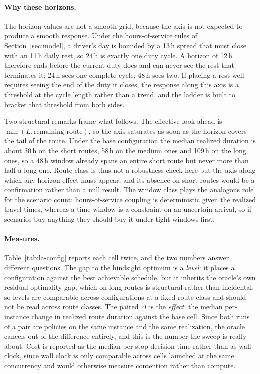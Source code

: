 \paragraph{Why these horizons.}
The horizon values are not a smooth grid, because the axis is not expected to
produce a smooth response.  Under the hours-of-service rules of
Section~\ref{sec:model}, a driver's day is bounded by a 13\,h spread that must
close with an 11\,h daily rest, so 24\,h is exactly one duty cycle.  A horizon
of 12\,h therefore ends before the current duty does and can never see the rest
that terminates it; 24\,h sees one complete cycle; 48\,h sees two.  If placing
a rest well requires seeing the end of the duty it closes, the response along
this axis is a threshold at the cycle length rather than a trend, and the
ladder is built to bracket that threshold from both sides.

Two structural remarks frame what follows.  The effective look-ahead is
$\min(L, \text{remaining route})$, so the axis saturates as soon as the horizon
covers the tail of the route.  Under the base configuration the median realized
duration is about 30\,h on the short routes, 58\,h on the medium ones and
109\,h on the long ones, so a 48\,h window already spans an entire short route
but never more than half a long one.  Route class is thus not a robustness
check here but the axis along which any horizon effect must appear, and its
absence on short routes would be a confirmation rather than a null result.  The
window class plays the analogous role for the scenario count: hours-of-service
coupling is deterministic given the realized travel times, whereas a time
window is a constraint on an uncertain arrival, so if scenarios buy anything
they should buy it under tight windows first.

\paragraph{Measures.}
Table~\ref{tab:la-config} reports each cell twice, and the two numbers answer
different questions.  The gap to the hindsight optimum is a \emph{level}: it
places a configuration against the best achievable schedule, but it inherits
the oracle's own residual optimality gap, which on long routes is structural
rather than incidental, so levels are comparable across configurations at a
fixed route class and should not be read across route classes.  The paired
$\Delta$ is the \emph{effect}: the median per-instance change in realized route
duration against the base cell.  Since both runs of a pair are policies on the
same instance and the same realization, the oracle cancels out of the
difference entirely, and this is the number the sweep is really about.  Cost is
reported as the median per-stop decision time rather than as wall clock, since
wall clock is only comparable across cells launched at the same concurrency and
would otherwise measure contention rather than compute.

